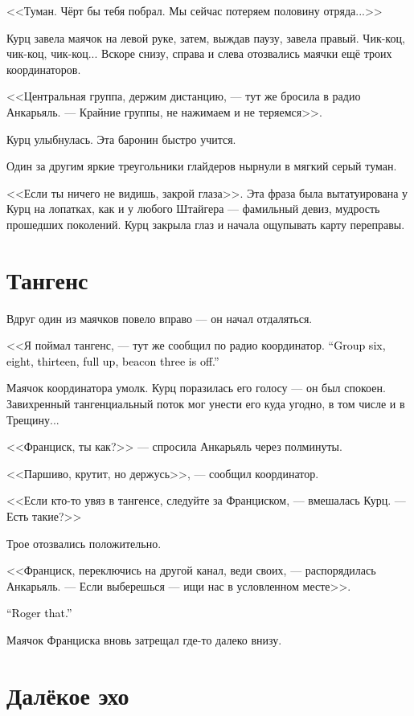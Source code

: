 \documentclass[a4paper,10pt,fleqn]{book}\usepackage{polyglossia}\setdefaultlanguage{english}\setotherlanguage{russian}\defaultfontfeatures{Ligatures=TeX,Mapping=tex-text}\usepackage{xcolor}\definecolor{lightgray}{HTML}{bbbbbb}\color{lightgray}\newcommand{\ml}[3]{\textcolor{black}{#3}}
\begin{document}
<<Туман.
Чёрт бы тебя побрал.
Мы сейчас потеряем половину отряда...>>

Курц завела маячок на левой руке, затем, выждав паузу, завела правый.
Чик-коц, чик-коц, чик-коц...
Вскоре снизу, справа и слева отозвались маячки ещё троих координаторов.

<<Центральная группа, держим дистанцию, --- тут же бросила в радио Анкарьяль.
--- Крайние группы, не нажимаем и не теряемся>>.

Курц улыбнулась.
Эта баронин быстро учится.

Один за другим яркие треугольники глайдеров нырнули в мягкий серый туман.

<<Если ты ничего не видишь, закрой глаза>>.
Эта фраза была вытатуирована у Курц на лопатках, как и у любого Штайгера --- фамильный девиз, мудрость прошедших поколений.
Курц закрыла глаз и начала ощупывать карту переправы.

\section{Тангенс}

Вдруг один из маячков повело вправо --- он начал отдаляться.

<<Я поймал тангенс, --- тут же сообщил по радио координатор.
\ml{$0$}
{--- Шестая, восьмая, тринадцатая группа --- вверх до упора, ориентир три --- отбой>>.}
{``Group six, eight, thirteen, full up, beacon three is off.''}

Маячок координатора умолк.
Курц поразилась его голосу --- он был спокоен.
Завихренный тангенциальный поток мог унести его куда угодно, в том числе и в Трещину...

<<Франциск, ты как?>> --- спросила Анкарьяль через полминуты.

<<Паршиво, крутит, но держусь>>, --- сообщил координатор.

<<Если кто-то увяз в тангенсе, следуйте за Франциском, --- вмешалась Курц.
--- Есть такие?>>

Трое отозвались положительно.

<<Франциск, переключись на другой канал, веди своих, --- распорядилась Анкарьяль.
--- Если выберешься --- ищи нас в условленном месте>>.

\ml{$0$}
{<<Понял>>.}
{``Roger that.''}

Маячок Франциска вновь затрещал где-то далеко внизу.

\section{Далёкое эхо}
\end{document}
